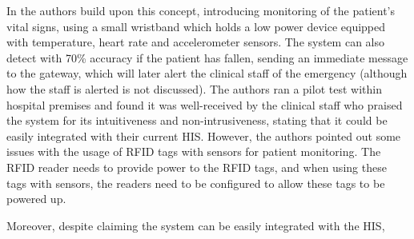 % 

In \cite{Adame2018} the authors build upon this concept, introducing monitoring of the patient's vital signs, using a small wristband which holds a low power device equipped with temperature, heart rate and accelerometer sensors. The system can also detect with 70\% accuracy if the patient has fallen, sending an immediate message to the gateway, which will later alert the clinical staff of the emergency (although how the staff is alerted is not discussed). The authors ran a pilot test within hospital premises and found it was well-received by the clinical staff who praised the system for its intuitiveness and non-intrusiveness, stating that it could be easily integrated with their current \acs{HIS}. However, the authors pointed out some issues with the usage of \acs{RFID} tags with sensors for patient monitoring. The \acs{RFID} reader needs to provide power to the \acs{RFID} tags, and when using these tags with sensors, the readers need to be configured to allow these tags to be powered up.

Moreover, despite claiming the system can be easily integrated with the \acs{HIS}, 

%
\cite{Catarinucci2015}

